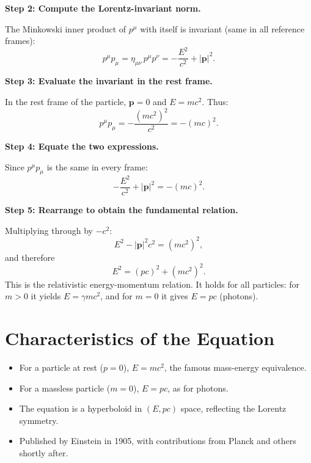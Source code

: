 \textbf{Step 2: Compute the Lorentz-invariant norm.}

The Minkowski inner product of $p^\mu$ with itself is invariant (same in all reference frames):
\begin{equation}
p^\mu p_\mu = \eta_{\mu\nu}\,p^\mu p^\nu = -\frac{E^2}{c^2} + |\mathbf{p}|^2.
\end{equation}

\textbf{Step 3: Evaluate the invariant in the rest frame.}

In the rest frame of the particle, $\mathbf{p} = 0$ and $E = mc^2$. Thus:
\begin{equation}
p^\mu p_\mu = -\frac{(mc^2)^2}{c^2} = -(mc)^2.
\end{equation}

\textbf{Step 4: Equate the two expressions.}

Since $p^\mu p_\mu$ is the same in every frame:
\begin{equation}
-\frac{E^2}{c^2} + |\mathbf{p}|^2 = -(mc)^2.
\end{equation}

\textbf{Step 5: Rearrange to obtain the fundamental relation.}

Multiplying through by $-c^2$:
\begin{equation}
E^2 - |\mathbf{p}|^2c^2 = (mc^2)^2,
\end{equation}
and therefore
\begin{equation}
\boxed{E^2 = (pc)^2 + (mc^2)^2.}
\end{equation}
This is the relativistic energy-momentum relation. It holds for all particles: for $m > 0$ it yields $E = \gamma mc^2$, and for $m = 0$ it gives $E = pc$ (photons).

\section*{Characteristics of the Equation}

\begin{itemize}
    \item For a particle at rest ($p = 0$), $E = mc^2$, the famous mass-energy equivalence.
    \item For a massless particle ($m = 0$), $E = pc$, as for photons.
    \item The equation is a hyperboloid in $(E, pc)$ space, reflecting the Lorentz symmetry.
    \item Published by Einstein in 1905, with contributions from Planck and others shortly after.
\end{itemize}
